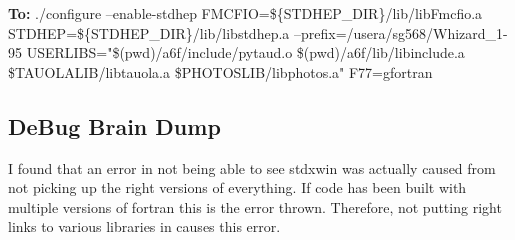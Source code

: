 \documentclass[11pt, oneside]{article}   	%
\begin{document}
\textbf{To:}
\newline
 ./configure --enable-stdhep FMCFIO=\$\{STDHEP\_DIR\}/lib/libFmcfio.a \newline
 STDHEP=\$\{STDHEP\_DIR\}/lib/libstdhep.a \newline
 --prefix=/usera/sg568/Whizard\_1-95 \newline
 USERLIBS="\$(pwd)/a6f/include/pytaud.o \$(pwd)/a6f/lib/libinclude.a \newline
 \$TAUOLALIB/libtauola.a \$PHOTOSLIB/libphotos.a" \newline
 F77=gfortran


\subsection{DeBug Brain Dump}

I found that an error in not being able to see stdxwin was actually caused from not picking up the right versions of everything.  If code has been built with multiple versions of fortran this is the error thrown.  Therefore, not putting right links to various libraries in causes this error.
\end{document}
